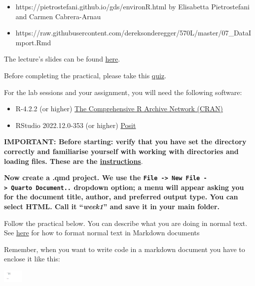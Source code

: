 \documentclass[
  letterpaper,
  DIV=11,
  numbers=noendperiod]{scrreprt}
\providecommand{\tightlist}{%
  \setlength{\itemsep}{0pt}\setlength{\parskip}{0pt}}\usepackage{longtable,booktabs,array}
\begin{document}
\begin{itemize}
\tightlist
\item
  https://pietrostefani.github.io/gds/environR.html by Elisabetta
  Pietrostefani and Carmen Cabrera-Arnau
\item
  https://raw.githubusercontent.com/dereksonderegger/570L/master/07\_DataImport.Rmd
\end{itemize}

The lecture's slides can be found
\href{https://github.com/GDSL-UL/stats/blob/main/lectures/lecture01.pdf}{here}.

Before completing the practical, please take this
\href{https://canvas.liverpool.ac.uk/courses/84668/quizzes/168721}{quiz}.

For the lab sessions and your assignment, you will need the following
software:

\begin{itemize}
\tightlist
\item
  R-4.2.2 (or higher) \href{https://cran.r-project.org/}{The
  Comprehensive R Archive Network (CRAN)}
\item
  RStudio 2022.12.0-353 (or higher)
  \href{https://posit.co/download/rstudio-desktop/}{Posit}
\end{itemize}

\textbf{IMPORTANT: Before starting: verify that you have set the
directory correctly and familiarise yourself with working with
directories and loading files. These are the
\href{https://gdsl-ul.github.io/stats/general/wdPaths.html}{instructions}}.

\textbf{Now create a .qmd project. We use the
\texttt{File\ -\textgreater{}\ New\ File\ -\textgreater{}\ Quarto\ Document..}
dropdown option; a menu will appear asking you for the document title,
author, and preferred output type. You can select HTML. Call it
``\emph{week1}'' and save it in your main folder.}

Follow the practical below. You can describe what you are doing in
normal text. See
\href{https://quarto.org/docs/authoring/markdown-basics.html}{here} for
how to format normal text in Markdown documents

Remember, when you want to write code in a markdown document you have to
enclose it like this:

\includegraphics[width=0.39in,height=\textheight,keepaspectratio]{labs/../img/codeChunk.png}
\end{document}
